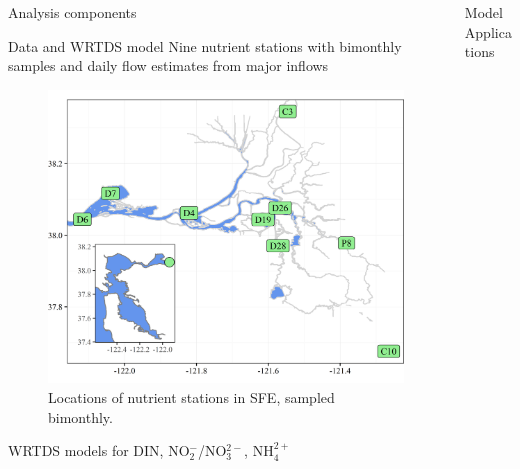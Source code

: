 \documentclass[final,t,serif]{beamer}\usepackage[]{graphicx}\usepackage[]{color}
\begin{document}
\begin{frame}{}
\begin{columns}[t]
\begin{column}{.31\linewidth}
\begin{block}{Analysis components}
      \end{block}
      		

			\begin{block}{Data and WRTDS model}
	    Nine nutrient stations with bimonthly samples and daily flow estimates from major inflows
	    
	    \begin{figure}
      \centerline{\includegraphics[width=0.75\linewidth]{posterfigs/stations.png}}
      \caption{\footnotesize Locations of nutrient stations in SFE, sampled bimonthly.}
	    \end{figure}
	    \vspace{-1.5cm}
	    WRTDS models for DIN, NO$_{2}^{-}$/NO$_{3}^{2-}$, NH$_{4}^{2+}$
			\end{block}

    \end{column}
    
    \begin{column}{.62\linewidth}

    
      \begin{block}{Model Applications}
      
      \begin{columns}
      

\end{columns}
\end{block}
\end{column}
\end{columns}
\end{frame}
\end{document}
